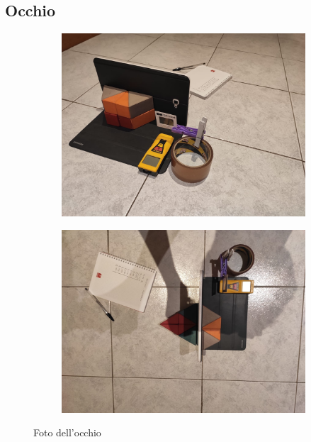 \documentclass{article}
\begin{document}
\subsection{Occhio}

\begin{figure}[h]
  \centering
  \begin{subfigure}[b]{0.4\linewidth}
    \includegraphics[width=\linewidth]{IM_foto_occhio_1}
  \end{subfigure}
  \begin{subfigure}[b]{0.4\linewidth}
    \includegraphics[width=\linewidth]{IM_foto_occhio_2}
  \end{subfigure}
  \caption{Foto dell'occhio}
\end{figure}
\end{document}
